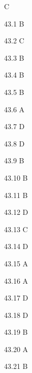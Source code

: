 \begin{Solution}{43}
C
\end{Solution}
\begin{Solution}{43.{1}}
B
\end{Solution}
\begin{Solution}{43.{2}}
C
\end{Solution}
\begin{Solution}{43.{3}}
B
\end{Solution}
\begin{Solution}{43.{4}}
B
\end{Solution}
\begin{Solution}{43.{5}}
B
\end{Solution}
\begin{Solution}{43.{6}}
A
\end{Solution}
\begin{Solution}{43.{7}}
D
\end{Solution}
\begin{Solution}{43.{8}}
D
\end{Solution}
\begin{Solution}{43.{9}}
B
\end{Solution}
\begin{Solution}{43.{10}}
B
\end{Solution}
\begin{Solution}{43.{11}}
B
\end{Solution}
\begin{Solution}{43.{12}}
D
\end{Solution}
\begin{Solution}{43.{13}}
C
\end{Solution}
\begin{Solution}{43.{14}}
D
\end{Solution}
\begin{Solution}{43.{15}}
A
\end{Solution}
\begin{Solution}{43.{16}}
A
\end{Solution}
\begin{Solution}{43.{17}}
D
\end{Solution}
\begin{Solution}{43.{18}}
D
\end{Solution}
\begin{Solution}{43.{19}}
B
\end{Solution}
\begin{Solution}{43.{20}}
A
\end{Solution}
\begin{Solution}{43.{21}}
B
\end{Solution}
